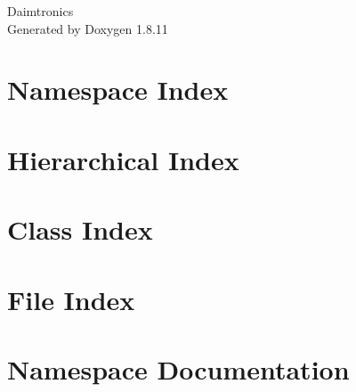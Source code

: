 \documentclass[twoside]{book}
\newcommand{\+}{\discretionary{\mbox{\scriptsize$\hookleftarrow$}}{}{}}
\newcommand{\clearemptydoublepage}{%
  \newpage{\pagestyle{empty}\cleardoublepage}%
}
\begin{document}
\hypersetup{pageanchor=false,
             bookmarksnumbered=true,
             pdfencoding=unicode
            }
\begin{titlepage}
\vspace*{7cm}
\begin{center}%
{\Large Daimtronics }\\
\vspace*{1cm}
{\large Generated by Doxygen 1.8.11}\\
\end{center}
\end{titlepage}
\clearemptydoublepage
\tableofcontents
\clearemptydoublepage
{}
\hypersetup{pageanchor=true}

\chapter{Namespace Index}

\chapter{Hierarchical Index}

\chapter{Class Index}

\chapter{File Index}

\chapter{Namespace Documentation}





\end{document}
